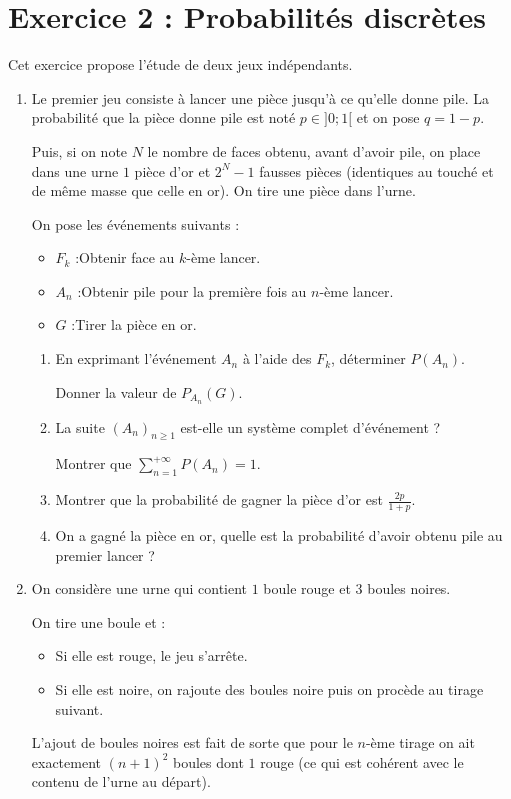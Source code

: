 \documentclass[twoside,french,11pt]{VcCours}
\begin{document}
\section*{Exercice 2 : Probabilités discrètes}
Cet exercice propose l'étude de deux jeux indépendants.
\begin{enumerate}
  \item Le premier jeu consiste à lancer une pièce jusqu'à ce qu'elle donne pile.
        La probabilité que la pièce donne pile est noté $p\in]0;1[$ et on pose $q=1-p$.

        Puis, si on note $N$ le nombre de faces obtenu, avant d'avoir pile,
        on place dans une urne $1$ pièce d'or et $2^N-1$ fausses pièces 
        (identiques au touché et de même masse que celle en or). On tire une pièce dans l'urne.

        On pose les événements suivants :
        \begin{itemize}
          \item $F_k$ :\og{}Obtenir face au $k$-ème lancer.\fg{}
          \item $A_n$ :\og{}Obtenir pile pour la première fois au $n$-ème lancer.\fg{}
          \item $G$ :\og{}Tirer la pièce en or.\fg{}
        \end{itemize}
        \begin{enumerate}
          \item En exprimant l'événement $A_n$ à l'aide des $F_k$, déterminer $P(A_n)$.

                Donner la valeur de $P_{A_n}(G)$.
          \item La suite $(A_n)_{n\geq1}$ est-elle un système complet d'événement ?

                Montrer que $\sum_{n=1}^{+\infty}P(A_n)=1$.
          \item Montrer que la probabilité de gagner la pièce d'or est $\frac{2p}{1+p}$.
          \item On a gagné la pièce en or, quelle est la probabilité d'avoir 
          obtenu pile au premier lancer ?
        \end{enumerate}
  \item On considère une urne qui contient $1$ boule rouge et $3$ boules noires.
  
        On tire une boule et :
        \begin{itemize}
          \item Si elle est rouge, le jeu s'arrête.
          \item Si elle est noire, on rajoute des boules noire puis on procède au tirage suivant.
        \end{itemize}
        L'ajout de boules noires est fait de sorte que pour le $n$-ème tirage on ait exactement $(n+1)^2$ 
        boules dont $1$ rouge (ce qui est cohérent avec le contenu de l'urne au départ).


\end{enumerate}
\end{document}

